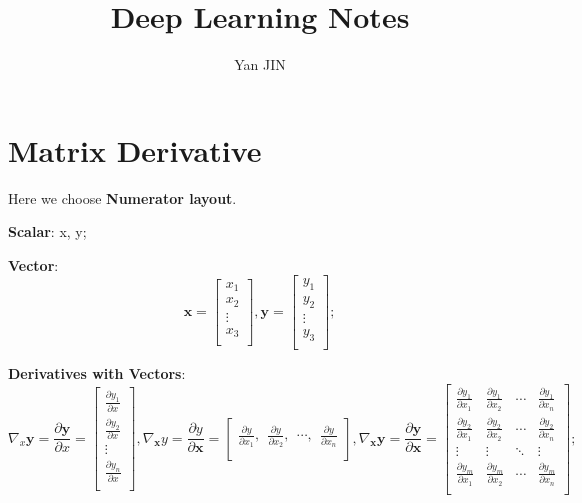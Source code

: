 \documentclass[12pt]{article}
\numberwithin{equation}{section}
\begin{document}
\small
    \title{Deep Learning\cite{Goodfellow-et-al-2016-Book} Notes}
    \author{Yan JIN}
    \pagestyle{fancy}\fancyhf{}
    \lhead{}
    \lfoot{\textit{}}\cfoot{}\rfoot{\thepage}
    \renewcommand{\headrulewidth}{1.pt}
    \renewcommand{\footrulewidth}{1.pt}
  \maketitle
  \tableofcontents
  
\section{Matrix Derivative}

Here we choose \textbf{Numerator layout}.

\textbf{Scalar}: x, y;

\textbf{Vector}:
\[
\mathbf{x} = 
\begin{bmatrix}
x_1\\ x_2\\ \vdots\\ x_3\\
\end{bmatrix}, 
\mathbf{y} = 
\begin{bmatrix}
y_1\\ y_2\\ \vdots\\ y_3\\
\end{bmatrix};
\]

\textbf{Derivatives with Vectors}:
\[
\nabla_{x} \mathbf{y} = \frac{\partial \mathbf{y}}{\partial x} =
\begin{bmatrix}
\frac{\partial y_1}{\partial x}\\
\frac{\partial y_2}{\partial x}\\
\vdots\\
\frac{\partial y_n}{\partial x}\\
\end{bmatrix},
\nabla_{\mathbf{x}} y = \frac{\partial y}{\partial \mathbf{x}} =
\begin{bmatrix}
\frac{\partial y}{\partial x_1},
\ \ \frac{\partial y}{\partial x_2},
\ \ \cdots,
\ \ \frac{\partial y}{\partial x_n}\\
\end{bmatrix},
\nabla_{\mathbf{x}} \mathbf{y} = \frac{\partial \mathbf{y}}{\partial \mathbf{x}} =
\begin{bmatrix}
\frac{\partial y_1}{\partial x_1} & \frac{\partial y_1}{\partial x_2} & \cdots & \frac{\partial y_1}{\partial x_n}\\
\frac{\partial y_2}{\partial x_1} & \frac{\partial y_2}{\partial x_2} & \cdots & \frac{\partial y_2}{\partial x_n}\\
\vdots & \vdots & \ddots & \vdots\\
\frac{\partial y_m}{\partial x_1} & \frac{\partial y_m}{\partial x_2} & \cdots & \frac{\partial y_m}{\partial x_n}\\
\end{bmatrix};
\]
 
\end{document}
